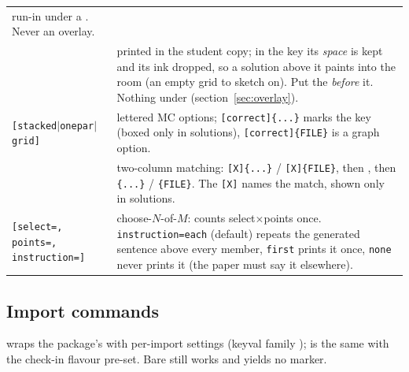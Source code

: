 \begin{center}
\begin{tabularx}{\linewidth}{@{}l Y@{}}
  run-in under a . Never an overlay.\\
 & printed in the student copy; in the key its \emph{space}
  is kept and its ink dropped, so a solution above it paints into the room
  (an empty grid to sketch on). Put the  \emph{before} it.
  Nothing under  (section~\ref{sec:overlay}).\\
\texttt{[stacked$\vert$onepar$\vert$grid]} & lettered MC
  options; \texttt{[correct]\{...\}} marks the key (boxed only
  in solutions), \texttt{[correct]\{FILE\}} is a graph
  option.\\
 & two-column matching: \texttt{[X]\{...\}} /
  \texttt{[X]\{FILE\}}, then , then
  \texttt{\{...\}} / \texttt{\{FILE\}}. The
  \texttt{[X]} names the match, shown only in solutions.\\
\texttt{[select=, points=, instruction=]} &
  choose-$N$-of-$M$: counts select$\times$points once.
  \texttt{instruction=each} (default) repeats the generated sentence above
  every member, \texttt{first} prints it once, \texttt{none} never prints it
  (the paper must say it elsewhere).\\
\end{tabularx}
\end{center}

\subsection*{Import commands}

 wraps the  package's  with
per-import settings (keyval family );
 is the same with the check-in flavour pre-set. Bare
 still works and yields no marker.

